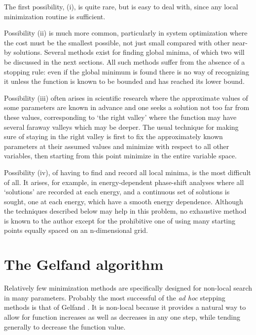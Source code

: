      The first possibility, (i), is quite rare, but is easy to deal with,
since any local minimization routine is sufficient.
 
     Possibility (ii) is much more common, particularly in system
optimization where the cost must be the smallest possible, not just
small compared with other near-by solutions.  Several methods exist for
finding global minima, of which two will be discussed in the next sections.
 All such methods suffer from the absence of a stopping rule:
even if the global minimum is found there is no way of recognizing it
unless the function is known to be bounded and has reached its lower
bound.
 
     Possibility (iii) often arises in scientific research where the
approximate values of some parameters are known in advance and one seeks
a solution not too far from these values, corresponding to `the right
valley' where the function may have several faraway valleys which may
be deeper.  The usual technique for making sure of staying in the right
valley is first to fix the approximately known parameters at their
assumed values and minimize with respect to all other variables, then
starting from this point minimize in the entire variable space.
 
     Possibility (iv), of having to find and record all local minima,
is the most difficult of all.  It arises, for example, in energy-dependent
phase-shift analyses where all `solutions' are recorded at each energy,
and a continuous set of solutions is sought, one at each energy, which
have a smooth energy dependence. Although the techniques described below
may help in this problem, no exhaustive method is known to the author
except for the prohibitive one of using many starting points equally
spaced on an n-dimensional grid.
 
 
\section{The Gelfand algorithm}
 
      Relatively few minimization methods are specifically designed for
non-local search in many parameters. Probably the most successful of
the {\em ad hoc} stepping methods is that of Gelfand \cite{Gelf}. It is non-local
because it provides a natural way to allow for function increases as
well as decreases in any one step, while tending generally to decrease
the function value.
 

